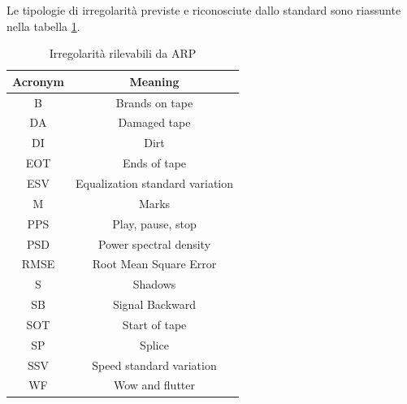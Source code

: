 Le tipologie di irregolarità previste e riconosciute dallo standard sono riassunte nella tabella \ref{tab:arp-irrs}.

\begin{table}[h]
    \centering
    \begin{tabular}{|c|c|}
        \hline
        \textbf{Acronym} &      \textbf{Meaning}\\
        \hline
        B       &   Brands on tape\\
        DA      &   Damaged tape\\
        DI      &   Dirt\\
        EOT     &   Ends of tape\\
        ESV     &   Equalization standard variation\\
        M       &   Marks\\
        PPS     &   Play, pause, stop\\
        PSD     &   Power spectral density\\
        RMSE    &   Root Mean Square Error\\
        S       &   Shadows\\
        SB      &   Signal Backward\\
        SOT     &   Start of tape\\
        SP      &   Splice\\
        SSV     &   Speed standard variation\\
        WF      &   Wow and flutter\\
        \hline
    \end{tabular}
    \caption{Irregolarità rilevabili da \ac{ARP}} \cite[tab. 21-22]{ieeeStandard3302-2022}
    \label{tab:arp-irrs}
\end{table}


